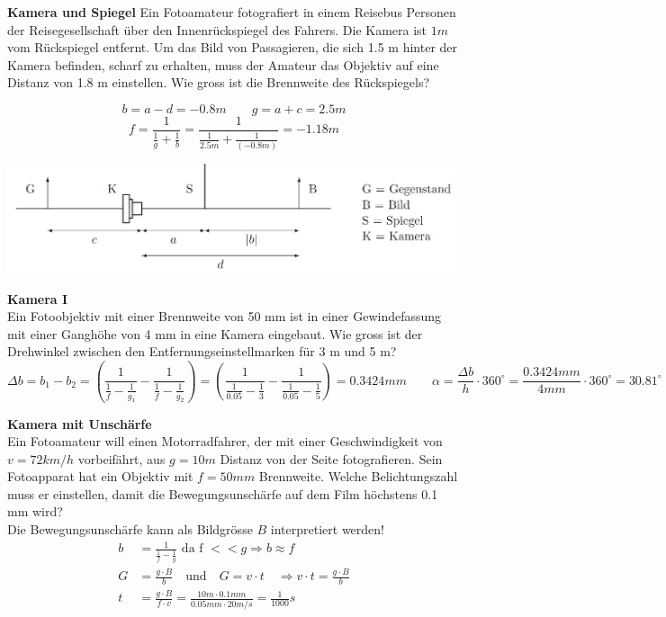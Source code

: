 \textbf{Kamera und Spiegel}
Ein Fotoamateur fotografiert in einem Reisebus Personen der Reisegesellschaft über den Innenrückspiegel des Fahrers. Die Kamera ist $1m$ vom Rückspiegel entfernt. Um das Bild von Passagieren, die sich 1.5 m hinter der Kamera befinden, scharf zu erhalten, muss der
Amateur das Objektiv auf eine Distanz von 1.8 m einstellen. Wie gross ist die Brennweite des Rückspiegels?

\begin{minipage}{0.39\textwidth}
\[
	b = a-d =-0.8m\qquad g = a+c = 2.5m
\]
\[
	f=\frac{1}{\frac{1}{g}+\frac{1}{b}} = \frac{1}{\frac{1}{2.5m}+\frac{1}{(-0.8m)}} = -1.18m
\]
\end{minipage}
\begin{minipage}{0.59\textwidth}
\includegraphics[width=0.99\textwidth]{bilder/a31.png}
\end{minipage}

\textbf{Kamera I}\\
Ein Fotoobjektiv mit einer Brennweite von 50 mm ist in einer Gewindefassung mit einer Ganghöhe von 4 mm in eine Kamera eingebaut. Wie gross ist der Drehwinkel zwischen
den Entfernungseinstellmarken für 3 m und 5 m?
\[
	\Delta b = b_1-b_2 = \left(\frac{1}{\frac{1}{f}-\frac{1}{g_1}}-  \frac{1}{\frac{1}{f}-\frac{1}{g_2}}\right) = \left(\frac{1}{\frac{1}{0.05}-\frac{1}{3}}-\frac{1}{\frac{1}{0.05}-\frac{1}{5}}\right) = 0.3424mm\qquad \alpha = \frac{\Delta b}{h} \cdot 360^\circ = \frac{0.3424mm}{4mm}\cdot 360^\circ = 30.81^\circ
\]

\textbf{Kamera mit Unschärfe}\\
Ein Fotoamateur will einen Motorradfahrer, der mit einer Geschwindigkeit von $v=72 km/h$ vorbeifährt, aus $g=10m$ Distanz von der Seite fotografieren. Sein Fotoapparat hat ein
Objektiv mit $f=50 mm$ Brennweite. Welche Belichtungszahl muss er einstellen, damit die
Bewegungsunschärfe auf dem Film höchstens 0.1 mm wird?\\
Die Bewegungsunschärfe kann als Bildgrösse $B$ interpretiert werden!
\begin{align*}
	b&= \frac{1}{\frac{1}{f}-\frac{1}{g}} \textrm{ da f }<< g \Rightarrow b\approx f\\
	G&= \frac{g\cdot B}{b} \quad \textrm{und} \quad G=v\cdot t \quad \Rightarrow v\cdot t = \frac{g\cdot B}{b}\\
	t&= \frac{g\cdot B}{f\cdot v} = \frac{10m \cdot 0.1mm}{0.05mm \cdot 20m/s}= \frac{1}{1000}s
\end{align*}

